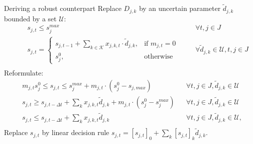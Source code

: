 \documentclass[aspectratio=169,slides]{beamer}
\begin{document}
\begin{frame}{Deriving a robust counterpart}
    \scriptsize
    Replace $D_{j,k}$ by an uncertain parameter $\tilde{d}_{j,k}$ bounded by a set $\mathcal{U}$:
    \vspace{-10pt}
    \begin{equation*}
    \begin{aligned}
    &
    && s_{j,t} \leq s_{j}^{max}
    &&& \forall t, j \in J\\
    &
    && s_{j,t} =
    \begin{cases}
    s_{j,t-1} + \sum_{k \in \mathcal{K}}{x_{j,k,t}\cdot \tilde{d}_{j,k}}, & \text{if } m_{j,t} = 0\\
    s_{j}^{0}, & \text{otherwise}
    \end{cases}
    &&& \forall \tilde{d}_{j,k} \in \mathcal{U}, t, j \in J\\
    \end{aligned}
    \end{equation*}
    \vspace{-5pt}
    Reformulate:
    \vspace{-5pt}
    \begin{equation*}
    \begin{aligned}
    & m_{j,t} s_{j}^{0} \leq s_{j,t} \leq s_{j}^{max} + m_{j,t} \cdot (s_{j}^{0} - s_{j,max})
    && \forall t, j \in J, \tilde{d}_{j,k} \in \mathcal{U}\\
    & s_{j,t} \geq s_{j,t-\Delta t} + \sum_{k}{x_{j,k,t}\tilde{d}_{j,k}} + m_{j,t} \cdot (s_{j}^{0} - s_{j}^{max})
    && \forall t, j \in J, \tilde{d}_{j,k} \in \mathcal{U}\\
    & s_{j,t} \leq s_{j,t-\Delta t} + \sum_{k}{x_{j,k,t}\tilde{d}_{j,k}}
    && \forall t, j \in J, \tilde{d}_{j,k} \in \mathcal{U},\\
    \end{aligned}
    \end{equation*}
Replace $s_{j,t}$ by linear decision rule $s_{j,t} = [s_{j,t}]_{0} + \sum_{k}{[s_{j,t}]_{k}\tilde{d}_{j,k}}$.
\end{frame}
\end{document}
